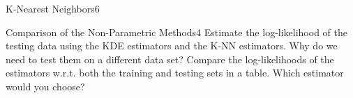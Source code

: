 \begin{questions}
\begin{question}{K-Nearest Neighbors}{6}
\begin{answer}\end{answer}

\end{question}


\begin{question}{Comparison of the Non-Parametric Methods}{4}
Estimate the log-likelihood of the testing data using the KDE estimators and the K-NN estimators.
Why do we need to test them on a different data set? Compare the log-likelihoods of the estimators w.r.t. both the training and testing sets in a table. Which estimator would you choose?

\begin{answer}\end{answer}

\end{question}

\end{questions}
